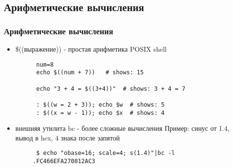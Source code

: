 \subsection{Арифметические вычисления}
\begin{frame}[fragile]
  \frametitle{Арифметические вычисления}
  \begin{itemize}
    \item \alert{\$((выражение))} - простая арифметика POSIX shell 
      \begin{verbatim}
      num=8
      echo $((num + 7))   # shows: 15

      echo "3 + 4 = $((3+4))"  # shows: 3 + 4 = 7
      
      : $((w = 2 + 3)); echo $w  # shows: 5
      : $((x = w - 1)); echo $x  # shows: 4
      \end{verbatim} \pause
    \item внешняя утилита \alert{bc} - более сложные вычисления\newline
      Пример: синус от 1.4, вывод в hex, 4 знака после запятой
      \begin{verbatim}
      $ echo "obase=16; scale=4; s(1.4)"|bc -l 
     .FC466EFA270812AC3
      \end{verbatim}
  \end{itemize}

\end{frame}




